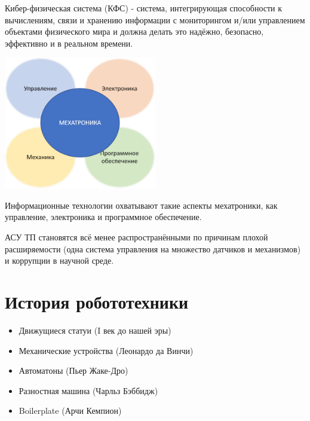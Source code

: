 \documentclass[12pt]{article}
\begin{document}
\begin{sloppypar}
    Кибер-физическая система (КФС) - система, интегрирующая способности к вычислениям,
    связи и хранению информации с мониторингом и/или управлением объектами
    физического мира и должна делать это надёжно, безопасно, эффективно и в
    реальном времени.

    \includegraphics[width=0.5\textwidth]{graphics/Мехатроника.png}

    Информационные технологии охватывают такие аспекты мехатроники, как управление, электроника и программное обеспечение.

    АСУ ТП становятся всё менее распространёнными по причинам плохой
    расширяемости (одна система управления на множество датчиков и механизмов) и
    коррупции в научной среде.

    \section{История робототехники}
    \begin{itemize}
        \item Движущиеся статуи (I век до нашей эры)
        \item Механические устройства (Леонардо да Винчи)
        \item Автоматоны (Пьер Жаке-Дро)
        \item Разностная машина (Чарльз Бэббидж)
        \item Boilerplate (Арчи Кемпион)
    \end{itemize}


\end{sloppypar}
\end{document}
